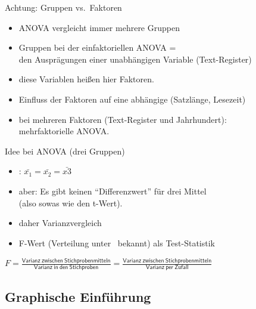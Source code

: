 \begin{frame}
  {Achtung: Gruppen vs.\ Faktoren}
  \begin{itemize}[<+->]
    \item ANOVA vergleicht immer \alert{mehrere Gruppen}
    \item Gruppen bei der einfaktoriellen ANOVA =\\
      den Ausprägungen \alert{einer unabhängigen Variable} (\zB Text-Register)
    \item diese Variablen heißen hier \alert{Faktoren}.
      \Zeile
    \item Einfluss der Faktoren auf \alert{eine abhängige} (\zB Satzlänge, Lesezeit)
      \Zeile
    \item bei mehreren Faktoren (\zB Text-Register und Jahrhundert):\\
      \alert{mehrfaktorielle ANOVA}.
  \end{itemize}
\end{frame}

\begin{frame}
  {Idee bei ANOVA (\zB drei Gruppen)}
  \begin{itemize}[<+->]
    \item \alert{\Null: $\bar{x_1}=\bar{x_2}=\bar{x3}$}
    \item aber: \alert{Es gibt keinen ``Differenzwert'' für drei Mittel}\\
      (also sowas wie den t-Wert).
      \Zeile
    \item daher \alert{Varianzvergleich}
    \item \alert{F-Wert} (Verteilung unter \Null\ bekannt) als Test-Statistik
  \end{itemize}
  \pause
  \vspace{0.5cm}
  \begin{center}
    \alert{$F=\frac{\mathsf{Varianz\ zwischen\ Stichprobenmitteln}}{\mathsf{Varianz\ in\ den\ Stichproben}}=\frac{\mathsf{Varianz\ zwischen\ Stichprobenmitteln}}{\mathsf{Varianz\ per\ Zufall}}$}
  \end{center}
\end{frame}


\subsection{Graphische Einführung}

